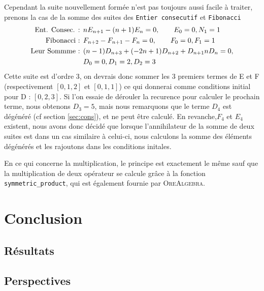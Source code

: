 \documentclass[12pt]{article}
\begin{document}
        \par Cependant la suite nouvellement formée n'est pas toujours aussi facile à traiter, prenons la cas
        de la somme des suites des  \texttt{Entier consecutif} et \texttt{Fibonacci}
        \begin{align*}
            \textnormal{Ent. Consec. : } &nE_{n+1} - (n+1)E_n = 0,\qquad E_0 = 0, N_1 = 1\\
            \textnormal{Fibonacci : } &F_{n+2} - F_{n+1} - F_n = 0,\qquad F_0=0, F_1=1\\
            \textnormal{Leur Sommme : } &(n - 1)D_{n+3} + (-2n + 1)D_{n+2} + D_{n+1} nD_n = 0, \\
            &D_0 = 0, D_1 = 2, D_2 = 3
        \end{align*} 
        Cette suite est d'ordre 3, on devrais donc sommer les 3 premiers termes de E et F (respectivement 
        $[0,1,2]$ et $[0,1,1]$) ce qui donnerai comme conditions initial pour D : $[0,2,3]$.
        Si 
        l'on essaie de dérouler la recurence pour calculer le prochain terme, nous obtenons $D_3 = 5$,
        mais nous remarquons que le terme $D_4$ est dégénéré (cf section \ref{sec:cons}), et ne peut 
        être calculé. En revanche,$F_4$ et $E_4$ existent, nous avons donc décidé que lorsque l'annihilateur
        de la somme de deux suites est dans un cas similaire à celui-ci, nous calculons la somme des
        éléments dégénérés et les rajoutons dans les conditions initales.
        \par En ce qui concerne la multiplication, le principe est exactement le même sauf que la 
        multiplication de deux opérateur se calcule grâce à la fonction \texttt{symmetric\_product},
        qui est également fournie par \textsc{OreAlgebra}.

\setcounter{secnumdepth}{0}
\section{Conclusion}
    \subsection{Résultats}
    \subsection{Perspectives}
       

\end{document}
